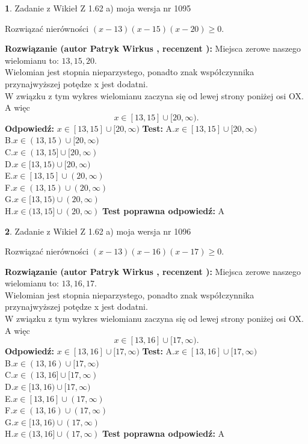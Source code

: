 \documentclass[12pt, a4paper]{article}
\theoremstyle{definition} %
\newtheorem{zad}{}
\newcommand{\zadStart}[1]{\begin{zad}#1\newline}
\newcommand{\zadStop}{\end{zad}}
\newcommand{\rozwStart}[2]{\noindent \textbf{Rozwiązanie (autor #1 , recenzent #2): }\newline}
\newcommand{\rozwStop}{\newline}
\newcommand{\odpStart}{\noindent \textbf{Odpowiedź:}\newline}
\newcommand{\odpStop}{\newline}
\newcommand{\testStart}{\noindent \textbf{Test:}\newline}
\newcommand{\testStop}{\newline}
\newcommand{\kluczStart}{\noindent \textbf{Test poprawna odpowiedź:}\newline}
\newcommand{\kluczStop}{\newline}
\begin{document}
\zadStart{Zadanie z Wikieł Z 1.62 a) moja wersja nr 1095}

Rozwiązać nierówności $(x-13)(x-15)(x-20)\ge0$.
\zadStop
\rozwStart{Patryk Wirkus}{}
Miejsca zerowe naszego wielomianu to: $13, 15, 20$.\\
Wielomian jest stopnia nieparzystego, ponadto znak współczynnika przy\linebreak najwyższej potędze x jest dodatni.\\ W związku z tym wykres wielomianu zaczyna się od lewej strony poniżej osi OX. A więc $$x \in [13,15] \cup [20,\infty).$$
\rozwStop
\odpStart
$x \in [13,15] \cup [20,\infty)$
\odpStop
\testStart
A.$x \in [13,15] \cup [20,\infty)$\\
B.$x \in (13,15) \cup [20,\infty)$\\
C.$x \in (13,15] \cup [20,\infty)$\\
D.$x \in [13,15) \cup [20,\infty)$\\
E.$x \in [13,15] \cup (20,\infty)$\\
F.$x \in (13,15) \cup (20,\infty)$\\
G.$x \in [13,15) \cup (20,\infty)$\\
H.$x \in (13,15] \cup (20,\infty)$
\testStop
\kluczStart
A
\kluczStop



\zadStart{Zadanie z Wikieł Z 1.62 a) moja wersja nr 1096}

Rozwiązać nierówności $(x-13)(x-16)(x-17)\ge0$.
\zadStop
\rozwStart{Patryk Wirkus}{}
Miejsca zerowe naszego wielomianu to: $13, 16, 17$.\\
Wielomian jest stopnia nieparzystego, ponadto znak współczynnika przy\linebreak najwyższej potędze x jest dodatni.\\ W związku z tym wykres wielomianu zaczyna się od lewej strony poniżej osi OX. A więc $$x \in [13,16] \cup [17,\infty).$$
\rozwStop
\odpStart
$x \in [13,16] \cup [17,\infty)$
\odpStop
\testStart
A.$x \in [13,16] \cup [17,\infty)$\\
B.$x \in (13,16) \cup [17,\infty)$\\
C.$x \in (13,16] \cup [17,\infty)$\\
D.$x \in [13,16) \cup [17,\infty)$\\
E.$x \in [13,16] \cup (17,\infty)$\\
F.$x \in (13,16) \cup (17,\infty)$\\
G.$x \in [13,16) \cup (17,\infty)$\\
H.$x \in (13,16] \cup (17,\infty)$
\testStop
\kluczStart
A
\kluczStop
\end{document}
